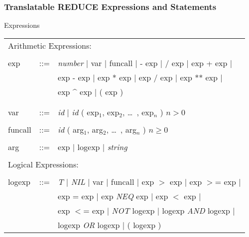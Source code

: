 \subsubsection{Translatable REDUCE Expressions and Statements}
\begin{describe}{Expressions}
\begin{tabular}{lll}
\multicolumn{3}{l}{Arithmetic Expressions:} \\
& & \\
exp & ::= & {\it number} $\mid$  var  $\mid$  funcall  $\mid$  - exp $\mid$
/ exp  $\mid$  exp + exp  $\mid$ \\
        & & exp - exp $\mid$ exp * exp  $\mid$  exp / exp  $\mid$  exp ** exp
 $\mid$ \\
        & & exp \^{} exp  $\mid$ ( exp )\\\\
& & \\
var & ::= & {\it id} $\mid$ {\it id} ( exp$_1$, exp$_2$, \dots\ , exp$_n$ )
 $n > 0$ \\
& & \\
funcall & ::= & {\it id} ( arg$_1$, arg$_2$, \dots\ , arg$_n$ ) $n \geq 0$ \\
& & \\
arg & ::=  & exp $\mid$ logexp $\mid$ {\it string} \\
& &\\
\multicolumn{3}{l}{Logical Expressions:}\\
& & \\
logexp & ::= & {\it T} $\mid$ {\it NIL} $\mid$  var  $\mid$  funcall $\mid$
        exp $>$ exp  $\mid$  exp $>$= exp $\mid$\\
        & & exp = exp  $\mid$ exp {\it NEQ} exp $\mid$ exp $<$ exp $\mid$ \\
        & & exp $<$= exp $\mid$ {\it NOT\/} logexp  $\mid$ logexp {\it AND\/}
 logexp $\mid$ \\
        & & logexp {\it OR\/} logexp  $\mid$  ( logexp )\\
\end{tabular}
\end{describe}

